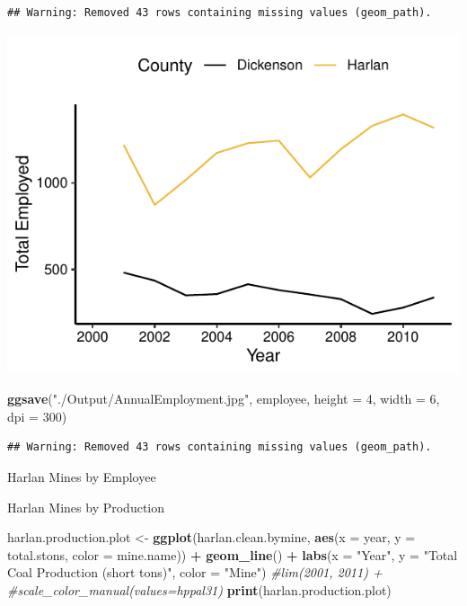 \documentclass[12pt,]{article}
\newenvironment{Shaded}{\begin{snugshade}}{\end{snugshade}}
\newcommand{\CommentTok}[1]{\textcolor[rgb]{0.56,0.35,0.01}{\textit{#1}}}
\newcommand{\DataTypeTok}[1]{\textcolor[rgb]{0.13,0.29,0.53}{#1}}
\newcommand{\DecValTok}[1]{\textcolor[rgb]{0.00,0.00,0.81}{#1}}
\newcommand{\KeywordTok}[1]{\textcolor[rgb]{0.13,0.29,0.53}{\textbf{#1}}}
\newcommand{\NormalTok}[1]{#1}
\newcommand{\OperatorTok}[1]{\textcolor[rgb]{0.81,0.36,0.00}{\textbf{#1}}}
\newcommand{\StringTok}[1]{\textcolor[rgb]{0.31,0.60,0.02}{#1}}
\begin{document}
\begin{verbatim}
## Warning: Removed 43 rows containing missing values (geom_path).
\end{verbatim}

\includegraphics{Smith_ENV872_Project_files/figure-latex/unnamed-chunk-8-1.pdf}

\begin{Shaded}
\begin{Highlighting}[]
\KeywordTok{ggsave}\NormalTok{(}\StringTok{"./Output/AnnualEmployment.jpg"}\NormalTok{, employee, }\DataTypeTok{height =} \DecValTok{4}\NormalTok{, }\DataTypeTok{width =} \DecValTok{6}\NormalTok{, }\DataTypeTok{dpi =} \DecValTok{300}\NormalTok{)}
\end{Highlighting}
\end{Shaded}

\begin{verbatim}
## Warning: Removed 43 rows containing missing values (geom_path).
\end{verbatim}

Harlan Mines by Employee

Harlan Mines by Production

\begin{Shaded}
\begin{Highlighting}[]
\NormalTok{harlan.production.plot <-}\StringTok{ }\KeywordTok{ggplot}\NormalTok{(harlan.clean.bymine, }\KeywordTok{aes}\NormalTok{(}\DataTypeTok{x =}\NormalTok{ year, }\DataTypeTok{y =}\NormalTok{ total.stons, }\DataTypeTok{color =}\NormalTok{ mine.name)) }\OperatorTok{+}
\StringTok{ }\KeywordTok{geom_line}\NormalTok{() }\OperatorTok{+}
\StringTok{  }\KeywordTok{labs}\NormalTok{(}\DataTypeTok{x =} \StringTok{"Year"}\NormalTok{, }\DataTypeTok{y =} \StringTok{"Total Coal Production (short tons)"}\NormalTok{, }\DataTypeTok{color =} \StringTok{"Mine"}\NormalTok{)}
  \CommentTok{#lim(2001, 2011) +}
  \CommentTok{#scale_color_manual(values=hppal31)}
\KeywordTok{print}\NormalTok{(harlan.production.plot)}
\end{Highlighting}
\end{Shaded}
\end{document}
